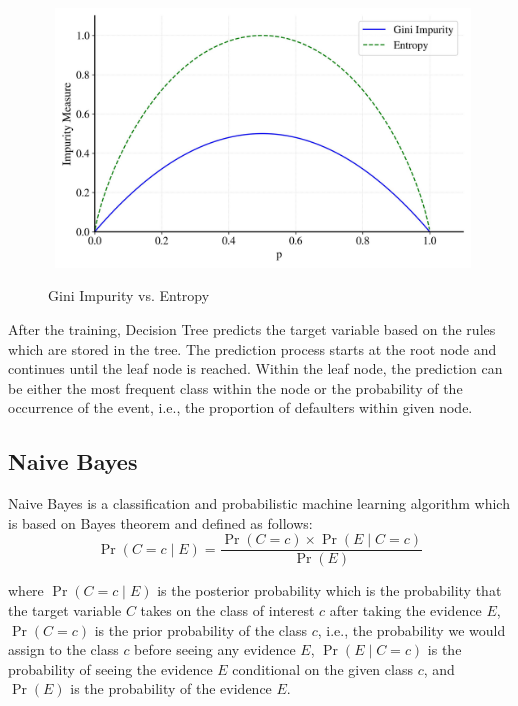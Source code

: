\begin{figure}[H]
    \centering
    \caption{Gini Impurity vs. Entropy}\vspace{0.5em}
    \label{fig:impurity}\
    \includegraphics[width=110mm]{Figures/impurity.jpg}

    \vspace{-1em}
\end{figure}

After the training, Decision Tree predicts the target variable based on the rules which are stored in the tree.
The prediction process starts at the root node and continues until the leaf node is reached. Within the leaf node, the prediction can be either the most frequent class within the node or the probability of the occurrence of the event, i.e., the proportion of defaulters within given node.
\newpage
\subsection{Naive Bayes}

Naive Bayes is a classification and probabilistic machine learning algorithm which is based on Bayes theorem and defined as follows:
\begin{equation}\label{eq}
    \operatorname{Pr}\left(C=c \mid E \right) = \frac{\operatorname{Pr}\left(C=c\right) \times \operatorname{Pr}\left(E \mid C=c\right)}{\operatorname{Pr}\left(E\right)}
\end{equation}

where $\operatorname{Pr}\left(C=c \mid E \right)$ is the posterior probability which is the probability that the target variable $C$ takes on the class of interest $c$ after taking the evidence $E$, $\operatorname{Pr}\left(C=c\right)$  is the prior probability of the class $c$, i.e., the probability we would assign to the class $c$ before seeing any evidence $E$,  $\operatorname{Pr}\left(E \mid C=c\right)$ is the probability of seeing the evidence $E$ conditional on the given class $c$,
and $\operatorname{Pr}\left(E\right)$ is the probability of the evidence $E$.

